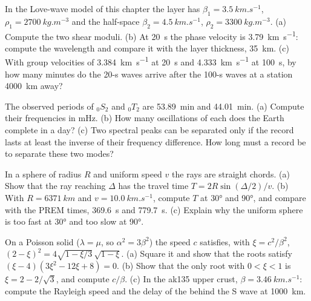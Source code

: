 \begin{exercise}[$\star$]\label{exo:b3:seismology-imaging:3}
In the Love-wave model of this chapter the layer has $\beta_1 =
\qty{3.5}{km.s^{-1}}$, $\rho_1 = \qty{2700}{kg.m^{-3}}$ and the half-space
$\beta_2 = \qty{4.5}{km.s^{-1}}$, $\rho_2 = \qty{3300}{kg.m^{-3}}$.
(a) Compute the two shear moduli. (b) At \qty{20}{s} the phase velocity is
\qty{3.79}{km.s^{-1}}: compute the wavelength and compare it with the layer
thickness, \qty{35}{km}. (c) With group velocities of \qty{3.384}{km.s^{-1}} at
\qty{20}{s} and \qty{4.333}{km.s^{-1}} at \qty{100}{s}, by how many minutes do
the 20-s waves arrive after the 100-s waves at a station \qty{4000}{km} away?
\end{exercise}

\begin{exercise}[$\star$]\label{exo:b3:seismology-imaging:4}
The observed periods of ${}_0S_2$ and ${}_0T_2$ are \qty{53.89}{min} and
\qty{44.01}{min}. (a) Compute their frequencies in \unit{mHz}. (b) How many
oscillations of each does the Earth complete in a day? (c) Two spectral peaks
can be separated only if the record lasts at least the inverse of their
frequency difference. How long must a record be to separate these two modes?
\end{exercise}

\begin{exercise}[$\star\star$]\label{exo:b3:seismology-imaging:5}
In a sphere of radius $R$ and uniform speed $v$ the rays are straight chords.
(a) Show that the ray reaching $\Delta$ has the travel time
$T = 2R\sin(\Delta/2)/v$. (b) With $R = \qty{6371}{km}$ and
$v = \qty{10.0}{km.s^{-1}}$, compute $T$ at \ang{30} and \ang{90}, and compare
with the PREM times, \qty{369.6}{s} and \qty{779.7}{s}. (c) Explain why the
uniform sphere is too fast at \ang{30} and too slow at \ang{90}.
\end{exercise}

\begin{exercise}[$\star\star$]\label{exo:b3:seismology-imaging:6}
On a Poisson solid ($\lambda = \mu$, so $\alpha^2 = 3\beta^2$) the 
speed $c$ satisfies, with $\xi = c^2/\beta^2$,
$(2 - \xi)^2 = 4\sqrt{1 - \xi/3}\,\sqrt{1 - \xi}$. (a) Square it and show
that the roots satisfy $(\xi - 4)(3\xi^2 - 12\xi + 8) = 0$. (b) Show that the
only root with $0 < \xi < 1$ is $\xi = 2 - 2/\sqrt3$, and compute $c/\beta$.
(c) In the ak135 upper crust, $\beta = \qty{3.46}{km.s^{-1}}$: compute the
Rayleigh speed and the delay of the  behind the S wave at
\qty{1000}{km}.
\end{exercise}

